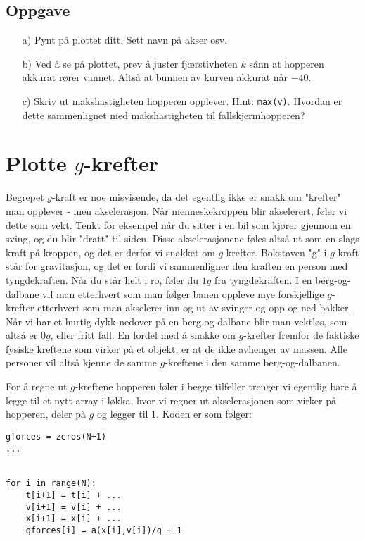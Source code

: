 \documentclass[a4paper, 11pt, notitlepage]{article}
\begin{document}
\subsection*{Oppgave}
\begin{itemize}
    \item[a)] Pynt på plottet ditt. Sett navn på akser osv.
    \item[b)] Ved å se på plottet, prøv å juster fjærstivheten $k$ sånn at hopperen akkurat rører vannet. Altså at bunnen av kurven akkurat når $-40.$
    \item[c)] Skriv ut makshastigheten hopperen opplever. Hint: \verb+max(v)+. Hvordan er dette sammenlignet med makshastigheten til fallskjermhopperen?
\end{itemize}

\clearpage

\section*{Plotte $g$-krefter}
Begrepet $g$-kraft er noe misvisende, da det egentlig ikke er snakk om "krefter" man opplever - men akselerasjon. Når menneskekroppen blir akselerert, føler vi dette som vekt. Tenkt for eksempel når du sitter i en bil som kjører gjennom en sving, og du blir "dratt" til siden. Disse akselerasjonene føles altså ut som en slags kraft på kroppen, og det er derfor vi snakket om $g$-krefter. Bokstaven "g" i $g$-kraft står for gravitasjon, og det er fordi vi sammenligner den kraften en person med tyngdekraften. Når du står helt i ro, føler du $1g$ fra tyngdekraften. I en berg-og-dalbane vil man etterhvert som man følger banen oppleve mye forskjellige $g$-krefter etterhvert som man akselerer inn og ut av svinger og opp og ned bakker. Når vi har et hurtig dykk nedover på en berg-og-dalbane blir man vektløs, som altså er $0g$, eller fritt fall. En fordel med å snakke om $g$-krefter fremfor de faktiske fysiske kreftene som virker på et objekt, er at de ikke avhenger av massen. Alle personer vil altså kjenne de samme $g$-kreftene i den samme berg-og-dalbanen.

For å regne ut $g$-kreftene hopperen føler i begge tilfeller trenger vi egentlig bare å legge til et nytt array i løkka, hvor vi regner ut akselerasjonen som virker på hopperen, deler på $g$ og legger til 1. Koden er som følger:
\begin{lstlisting}
gforces = zeros(N+1)
...


for i in range(N):
    t[i+1] = t[i] + ...
    v[i+1] = v[i] + ...
    x[i+1] = x[i] + ...
    gforces[i] = a(x[i],v[i])/g + 1
\end{lstlisting}
\end{document}
